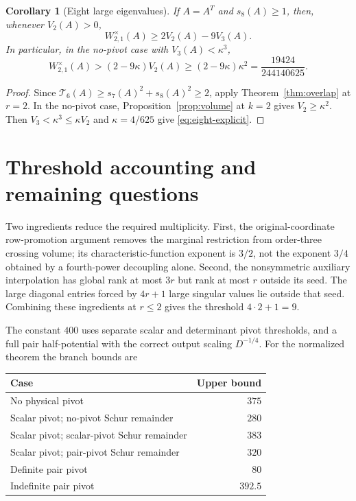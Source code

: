 \documentclass[11pt]{article}
\numberwithin{equation}{section}
\newtheorem{corollary}[theorem]{Corollary}
\theoremstyle{definition}\newtheorem{definition}[theorem]{Definition}
\theoremstyle{remark}\newtheorem{remark}[theorem]{Remark}
\newcommand{\1}{\mathbf 1}\newcommand{\diag}{\operatorname{diag}}
\begin{document}
\begin{corollary}[Eight large eigenvalues]\label{cor:eight-overlap}
If $A=A^T$ and $s_8(A)\ge1$, then, whenever $V_2(A)>0$,
\begin{equation}\label{eq:eight-overlap}
 W_{2,1}^{\times}(A)\ge2V_2(A)-9V_3(A).
\end{equation}
In particular, in the no-pivot case with $V_3(A)<\kappa^3$,
\begin{equation}\label{eq:eight-explicit}
 W_{2,1}^{\times}(A)>(2-9\kappa)V_2(A)
 \ge(2-9\kappa)\kappa^2=\frac{19424}{244140625}.
\end{equation}
\end{corollary}
\begin{proof}
Since $\mathcal T_6(A)\ge s_7(A)^2+s_8(A)^2\ge2$, apply Theorem~\ref{thm:overlap} at $r=2$. In the no-pivot case, Proposition~\ref{prop:volume} at $k=2$ gives $V_2\ge\kappa^2$. Then $V_3<\kappa^3\le\kappa V_2$ and $\kappa=4/625$ give \eqref{eq:eight-explicit}.
\end{proof}

\section{Threshold accounting and remaining questions}
Two ingredients reduce the required multiplicity. First, the original-coordinate row-promotion argument removes the marginal restriction from order-three crossing volume; its characteristic-function exponent is $3/2$, not the exponent $3/4$ obtained by a fourth-power decoupling alone. Second, the nonsymmetric auxiliary interpolation has global rank at most $3r$ but rank at most $r$ outside its seed. The large diagonal entries forced by $4r+1$ large singular values lie outside that seed. Combining these ingredients at $r\le2$ gives the threshold $4\cdot2+1=9$.

The constant $400$ uses separate scalar and determinant pivot thresholds, and a full pair half-potential with the correct output scaling $D^{-1/4}$. For the normalized theorem the branch bounds are
\begin{center}
\begin{tabular}{lr}
\toprule
Case & Upper bound\\
\midrule
No physical pivot & $375$\\
Scalar pivot; no-pivot Schur remainder & $280$\\
Scalar pivot; scalar-pivot Schur remainder & $383$\\
Scalar pivot; pair-pivot Schur remainder & $320$\\
Definite pair pivot & $80$\\
Indefinite pair pivot & $392.5$\\
\bottomrule
\end{tabular}
\end{center}
\end{document}
